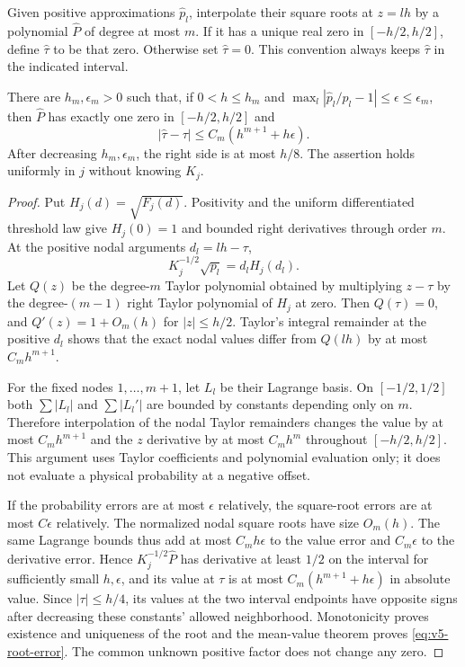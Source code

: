 Given positive approximations $\widehat p_l$, interpolate their square
roots at $z=lh$ by a polynomial $\widehat P$ of degree at most $m$.
If it has a unique real zero in $[-h/2,h/2]$, define $\widehat\tau$ to
be that zero. Otherwise set $\widehat\tau=0$. This convention always
keeps $\widehat\tau$ in the indicated interval.

\begin{lemma}\label{lem:v5-calibration}
There are $h_m,\epsilon_m>0$ such that, if $0<h\le h_m$ and
$\max_l|\widehat p_l/p_l-1|\le\epsilon\le\epsilon_m$, then
$\widehat P$ has exactly one zero in $[-h/2,h/2]$ and
\begin{equation}\label{eq:v5-root-error}
            |\widehat\tau-\tau|
                   \le C_m(h^{m+1}+h\epsilon).
\end{equation}
After decreasing $h_m,\epsilon_m$, the right side is at most $h/8$.
The assertion holds uniformly in $j$ without knowing $K_j$.
\end{lemma}
\begin{proof}
Put $H_j(d)=\sqrt{F_j(d)}$. Positivity and the uniform differentiated
threshold law give $H_j(0)=1$ and bounded right derivatives through
order $m$. At the positive nodal arguments $d_l=lh-\tau$,
\[
 K_j^{-1/2}\sqrt{p_l}=d_lH_j(d_l).
\]
Let $Q(z)$ be the degree-$m$ Taylor polynomial obtained by multiplying
$z-\tau$ by the degree-$(m-1)$ right Taylor polynomial of $H_j$ at zero.
Then $Q(\tau)=0$, and $Q'(z)=1+O_m(h)$ for $|z|\le h/2$.
Taylor's integral remainder at the positive $d_l$ shows that the exact
nodal values differ from $Q(lh)$ by at most $C_mh^{m+1}$.

For the fixed nodes $1,\ldots,m+1$, let $L_l$ be their Lagrange basis.
On $[-1/2,1/2]$ both $\sum|L_l|$ and $\sum|L_l'|$ are bounded by
constants depending only on $m$. Therefore interpolation of the nodal
Taylor remainders changes the value by at most $C_mh^{m+1}$ and the
$z$ derivative by at most $C_mh^m$ throughout $[-h/2,h/2]$.
This argument uses Taylor coefficients and polynomial evaluation only;
it does not evaluate a physical probability at a negative offset.

If the probability errors are at most $\epsilon$ relatively, the
square-root errors are at most $C\epsilon$ relatively. The normalized
nodal square roots have size $O_m(h)$. The same Lagrange bounds thus
add at most $C_mh\epsilon$ to the value error and $C_m\epsilon$ to the
derivative error. Hence $K_j^{-1/2}\widehat P$ has derivative at least
$1/2$ on the interval for sufficiently small $h,\epsilon$, and its value
at $\tau$ is at most $C_m(h^{m+1}+h\epsilon)$ in absolute value.
Since $|\tau|\le h/4$, its values at the two interval endpoints have
opposite signs after decreasing these constants' allowed neighborhood.
Monotonicity proves existence and uniqueness of the root and the
mean-value theorem proves \eqref{eq:v5-root-error}. The common unknown
positive factor does not change any zero.
\end{proof}


